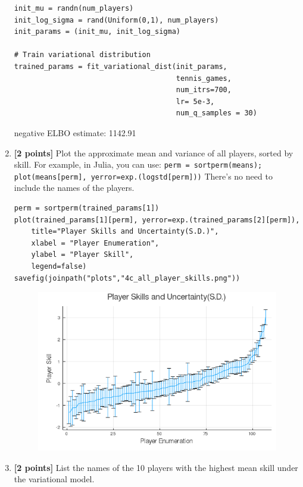 \documentclass{article}
\begin{document}
\begin{enumerate}[label=(\alph*)]
\begin{verbatim}
init_mu = randn(num_players)
init_log_sigma = rand(Uniform(0,1), num_players)
init_params = (init_mu, init_log_sigma)

# Train variational distribution
trained_params = fit_variational_dist(init_params,
                                      tennis_games,
                                      num_itrs=700,
                                      lr= 5e-3,
                                      num_q_samples = 30)
\end{verbatim}
  
  negative ELBO estimate: 1142.91

  \pagebreak
  
\item {\bf [2 points]} Plot the approximate mean and variance of all players, sorted by skill.  For example, in Julia, you can use:
\texttt{perm = sortperm(means);
	plot(means[perm], yerror=exp.(logstd[perm]))}
      There's no need to include the names of the players.

\begin{verbatim}
perm = sortperm(trained_params[1])
plot(trained_params[1][perm], yerror=exp.(trained_params[2][perm]),
    title="Player Skills and Uncertainty(S.D.)",
    xlabel = "Player Enumeration",
    ylabel = "Player Skill",
    legend=false)
savefig(joinpath("plots","4c_all_player_skills.png"))
\end{verbatim}

\begin{figure}[h]
  \centering
  \includegraphics[width=12cm,keepaspectratio]{plots/4c_all_player_skills.png}
\end{figure}

\item {\bf [2 points]} List the names of the 10 players with the highest mean skill under the variational model.


\end{enumerate}
\end{document}
